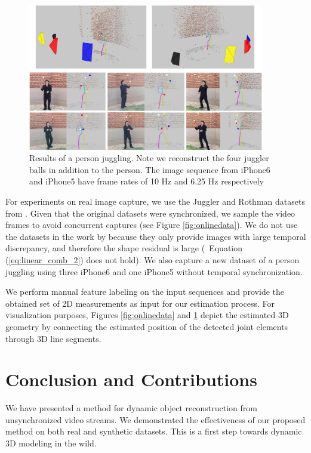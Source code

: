 \begin{figure}
\centering
\includegraphics[width=0.92\textwidth]{chapter5/resource/3_pdfsam_image_cropped.pdf}
\caption{Results of a person juggling. Note we reconstruct the four juggler balls in addition to the person. The image sequence from iPhone6 and iPhone5 have frame rates of 10 Hz and 6.25 Hz respectively}
\label{fig:juggler2}
\end{figure}
For experiments on real image capture, we use the Juggler and Rothman datasets from \cite{ballan2010unstructured}. Given that the original datasets were synchronized, we sample the video frames to avoid concurrent captures (see Figure \ref{fig:onlinedata}). 
We do not use the datasets in the work by \citet{Basha_ECCV2012,Park_ECCV2010} because they only provide images with large temporal discrepancy, and therefore the shape residual is large (\ie~Equation (\ref{eq:linear_comb_2}) does not hold). We also capture a new dataset of a person juggling using three iPhone6 and one iPhone5 without temporal synchronization. 

We perform manual feature labeling on the input sequences and provide the obtained set of 2D measurements as input for our estimation process.
For visualization purposes, Figures \ref{fig:onlinedata} and \ref{fig:juggler2} depict the estimated 3D geometry by connecting the estimated position of the detected joint elements through 3D line segments. 


\section{Conclusion and Contributions} \label{sec:conclusion_l1}
We have presented a method for dynamic object reconstruction from unsynchronized video streams. 
We demonstrated the effectiveness of our proposed method on both real and synthetic datasets.   This is a first step towards dynamic 3D modeling in the wild.

